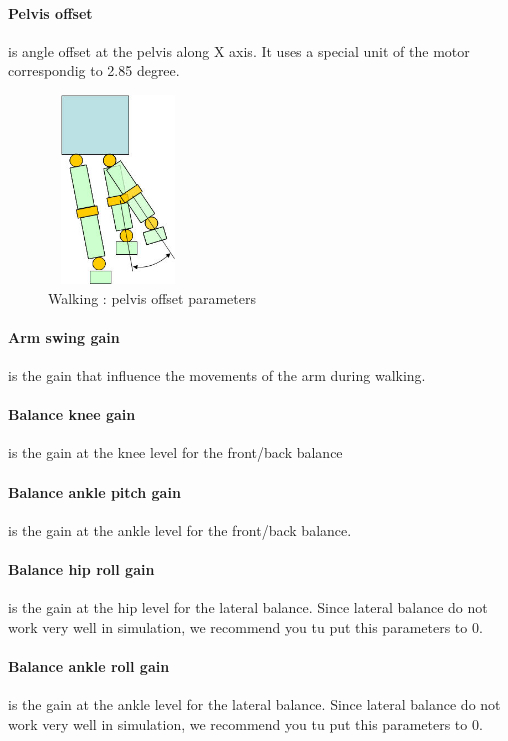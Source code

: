 \documentclass[a4paper, 12pt]{article}  		%
\begin{document}
\paragraph*{Pelvis offset}
is angle offset at the pelvis along X axis. It uses a special unit of the motor correspondig to 2.85 degree.
\begin{figure}[H]
\begin{center}
\includegraphics[height=5cm, width=3.7cm]{pelvis_offset.jpg}
\caption{Walking : pelvis offset parameters}
\label{pelvis_offset}
\end{center}
\end{figure}

\paragraph*{Arm swing gain}
is the gain that influence the movements of the arm during walking.

\paragraph*{Balance knee gain}
is the gain at the knee level for the front/back balance

\paragraph*{Balance ankle pitch gain}
is the gain at the ankle level for the front/back balance.

\paragraph*{Balance hip roll gain}
is the gain at the hip level for the lateral balance. Since lateral balance do not work very well in simulation, we recommend you tu put this parameters to 0.

\paragraph*{Balance ankle roll gain}
is the gain at the ankle level for the lateral balance. Since lateral balance do not work very well in simulation, we recommend you tu put this parameters to 0.
\end{document}
